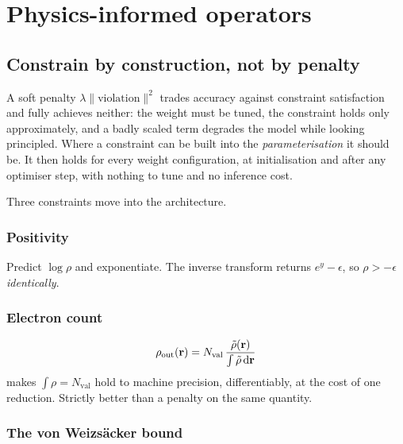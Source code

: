 \chapter{Physics-informed operators}
\label{ch:pifno}

\section{Constrain by construction, not by penalty}

A soft penalty $\lambda\lVert\text{violation}\rVert^2$ trades accuracy against
constraint satisfaction and fully achieves neither: the weight must be tuned,
the constraint holds only approximately, and a badly scaled term degrades the
model while looking principled. Where a constraint can be built into the
\emph{parameterisation} it should be. It then holds for every weight
configuration, at initialisation and after any optimiser step, with nothing to
tune and no inference cost.

Three constraints move into the architecture.

\subsection{Positivity}

Predict $\log\rho$ and exponentiate. The inverse transform returns
$e^{y}-\epsilon$, so $\rho > -\epsilon$ \emph{identically}.

\subsection{Electron count}

\begin{equation}
  \rho_{\mathrm{out}}(\mathbf{r}) = N_{\mathrm{val}}\,
    \frac{\tilde\rho(\mathbf{r})}{\int \tilde\rho\,\mathrm{d}\mathbf{r}}
\end{equation}
makes $\int\rho = N_{\mathrm{val}}$ hold to machine precision, differentiably,
at the cost of one reduction. Strictly better than a penalty on the same
quantity.

\subsection{The von Weizsäcker bound}
\label{sec:pauli-head}

